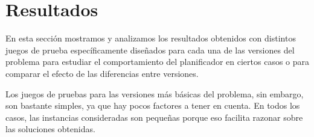 
\section{Resultados} \label{sec:resultados}

En esta sección mostramos y analizamos los resultados obtenidos con distintos 
juegos de prueba específicamente diseñados para cada una de las versiones 
del problema para estudiar el comportamiento del planificador en ciertos casos 
o para comparar el efecto de las diferencias entre versiones. 

Los juegos de pruebas para las versiones más básicas del problema, sin 
embargo, son bastante simples, ya que hay pocos factores a tener en cuenta. 
En todos los casos, las instancias consideradas son pequeñas porque eso 
facilita razonar sobre las soluciones obtenidas.















\clearpage

